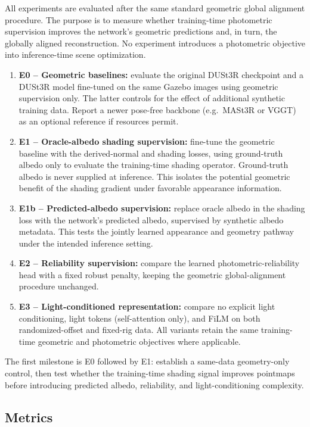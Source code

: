 \documentclass[11pt,a4paper]{article}
\begin{document}
All experiments are evaluated after the same standard geometric global
alignment procedure. The purpose is to measure whether training-time
photometric supervision improves the network's geometric predictions and,
in turn, the globally aligned reconstruction. No experiment introduces a
photometric objective into inference-time scene optimization.
\begin{enumerate}
  \item \textbf{E0 -- Geometric baselines:} evaluate the original DUSt3R
  checkpoint and a DUSt3R model fine-tuned on the same Gazebo images using
  geometric supervision only. The latter controls for the effect of
  additional synthetic training data. Report a newer pose-free backbone
  (e.g.\ MASt3R or VGGT) as an optional reference if resources permit.
  \item \textbf{E1 -- Oracle-albedo shading supervision:} fine-tune the
  geometric baseline with the derived-normal and shading losses, using
  ground-truth albedo only to evaluate the training-time shading operator.
  Ground-truth albedo is never supplied at inference. This isolates the
  potential geometric benefit of the shading gradient under favorable
  appearance information.
  \item \textbf{E1b -- Predicted-albedo supervision:} replace oracle albedo
  in the shading loss with the network's predicted albedo, supervised by
  synthetic albedo metadata. This tests the jointly learned appearance and
  geometry pathway under the intended inference setting.
  \item \textbf{E2 -- Reliability supervision:} compare the learned
  photometric-reliability head with a fixed robust penalty, keeping the
  geometric global-alignment procedure unchanged.
  \item \textbf{E3 -- Light-conditioned representation:} compare no explicit
  light conditioning, light tokens (self-attention only), and FiLM on both
  randomized-offset and fixed-rig data. All variants retain the same
  training-time geometric and photometric objectives where applicable.
\end{enumerate}
The first milestone is E0 followed by E1: establish a same-data
geometry-only control, then test whether the training-time shading signal
improves pointmaps before introducing predicted albedo, reliability, and
light-conditioning complexity.

\subsection{Metrics}
\end{document}
